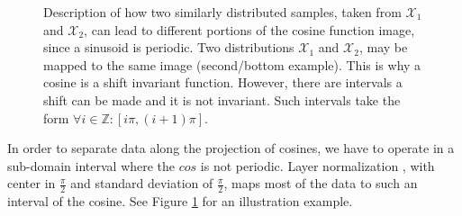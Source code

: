 \documentclass{article}
\begin{document}
\begin{figure}[ht]
    \caption{Description of how two similarly distributed samples, taken from $\mathcal{X}_1$ and $\mathcal{X}_2$, can lead to different portions of the cosine function image, since a sinusoid is periodic. Two distributions $\mathcal{X}_1$ and $\mathcal{X}_2$, may be mapped to the same image (second/bottom example). This is why a cosine is a shift invariant function. However, there are intervals a shift can be made and it is not invariant. Such intervals take the form $\forall i \in \mathbb{Z}: [i \pi, (i+1)\pi]$.}
    \label{fig:normalization_shift}
\end{figure}

In order to separate data along the projection of cosines, we have to operate in a sub-domain interval where the $cos$ is not periodic. Layer normalization \cite{ba2016layer}, with center in $\frac{\pi}{2}$ and standard deviation of $\frac{\pi}{2}$, maps most of the data to such an interval of the cosine. See Figure \ref{fig:normalization_shift} for an illustration example.
\end{document}
